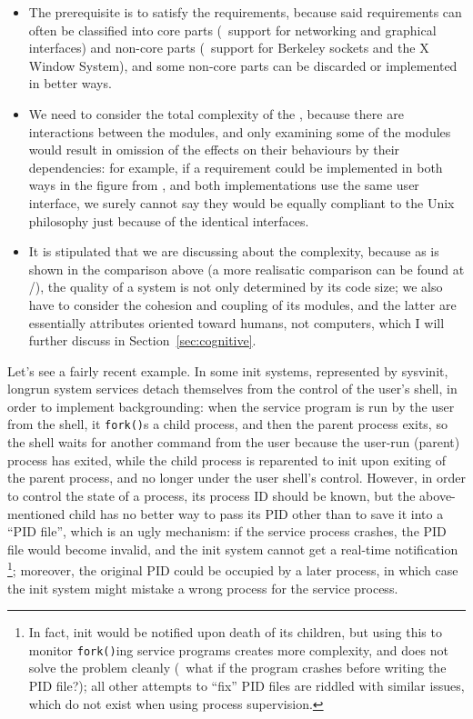 \begin{itemize}
\item The prerequisite is to  satisfy the requirements,
	because said requirements can often be classified into core parts
	(\eg~support for networking and graphical interfaces) and non-core
	parts (\eg~support for Berkeley sockets and the X Window System),
	and some non-core parts can be discarded or implemented in better ways.
\item We need to consider the total complexity of the , because
	there are interactions between the modules, and only examining some of the
	modules would result in omission of the effects on their behaviours by
	their dependencies: for example, if a requirement could be implemented in	
	both ways in the figure from \parencite{litt2014a}, and both implementations
	use the same user interface, we surely cannot say they would be equally
	compliant to the Unix philosophy just because of the identical interfaces.
\item It is stipulated that we are discussing about the 
	complexity, because as is shown in the comparison above (a more realisatic
	comparison can be found at \parencite{github:acmetiny}/\parencite%
	{gitlab:emca}), the quality of a system is not only determined by its code
	size; we also have to consider the cohesion and coupling of its modules,
	and the latter are essentially attributes oriented toward humans, not
	computers, which I will further discuss in Section~\ref{sec:cognitive}.
\end{itemize}

Let's see a fairly recent example.  In some init systems, represented by
sysvinit, longrun system services detach themselves from the control of the
user's shell, in order to implement backgrounding: when
the service program is run by the user from the shell, it \verb|fork()|s a
child process, and then the parent process exits, so the shell waits for another
command from the user because the user-run (parent) process has exited, while
the child process is reparented to init upon exiting of the parent process, and
no longer under the user shell's control.  However, in order to control the
state of a process, its process ID should be known, but the above-mentioned
child has no better way to pass its PID other than to save it into a ``PID
file'', which is an ugly mechanism: if the service process crashes, the PID file
would become invalid, and the init system cannot get a real-time notification%
\footnote{In fact, init would be notified upon death of its children, but using
this to monitor \texttt{fork()}ing service programs creates more complexity,
and does not solve the problem cleanly (\eg~what if the program crashes before
writing the PID file?); all other attempts to ``fix'' PID files are riddled
with similar issues, which do not exist when using process supervision.};
moreover, the original PID could be occupied by a later process, in which
case the init system might mistake a wrong process for the service process.

